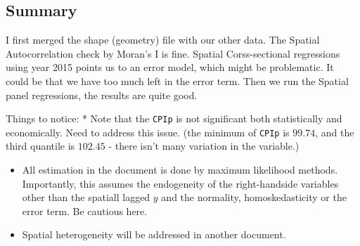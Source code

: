 \documentclass[
]{article}
\begin{document}
\hypertarget{summary}{%
\subsection{Summary}\label{summary}}

I first merged the shape (geometry) file with our other data. The
Spatial Autocorrelation check by Moran's I is fine. Spatial
Corss-sectional regressions using year 2015 points us to an error model,
which might be problematic. It could be that we have too much left in
the error term. Then we run the Spatial panel regressions, the results
are quite good.

Things to notice: * Note that the \texttt{CPIp} is not significant both
statistically and economically. Need to address this issue. (the minimum
of \texttt{CPIp} is \(99.74\), and the third quantile is \(102.45\) -
there isn't many variation in the variable.)

\begin{itemize}
\item
  All estimation in the document is done by maximum likelihood methods.
  Importantly, this assumes the endogeneity of the right-handside
  variables other than the spatiall lagged \(y\) and the normality,
  homoskedasticity or the error term. Be cautious here.
\item
  Spatial heterogeneity will be addressed in another document.
\end{itemize}
\end{document}
